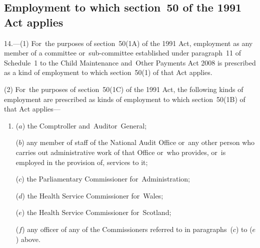 \documentclass[12pt,a4paper]{article}
\begin{document}
%
%
%
%
%
%

\subsection[14. Employment to which section~50 of the 1991 Act applies]{Employment to which section~50 of the 1991 Act applies}

14.---(1)  For~the purposes of section~50(1A) of the 1991 Act, employment as any member of a committee or~sub-committee established under paragraph~11 of Schedule~1 to the Child Maintenance and~Other Payments Act 2008 is prescribed as a kind of employment to which section~50(1) of that Act applies.

(2) For~the purposes of section~50(1C) of the 1991 Act, the following kinds of employment are prescribed as kinds of employment to which section~50(1B) of that Act applies—
\begin{enumerate}\item[]
($a$) the Comptroller and~Auditor~General;

($b$) any member of staff of the National Audit Office or~any other person who carries out administrative work of that Office or~who provides, or~is employed in the provision of, services to it;

($c$) the Parliamentary Commissioner for~Administration;

($d$) the Health Service Commissioner for~Wales;

($e$) the Health Service Commissioner for~Scotland;

($f$) any officer of any of the Commissioners referred to in paragraphs~($c$)  to ($e$)    above.
\end{enumerate}
\end{document}

